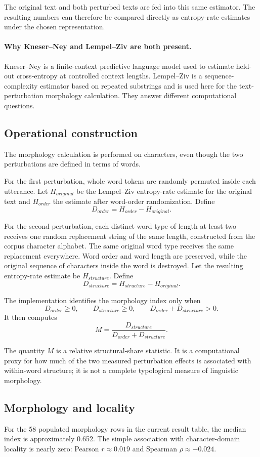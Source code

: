 \documentclass[11pt]{article}
\begin{document}
The original text and both perturbed texts are fed into this same estimator. The resulting numbers can therefore be compared directly as entropy-rate estimates under the chosen representation.

\paragraph{Why Kneser--Ney and Lempel--Ziv are both present.}
Kneser--Ney is a finite-context predictive language model used to estimate held-out cross-entropy at controlled context lengths. Lempel--Ziv is a sequence-complexity estimator based on repeated substrings and is used here for the text-perturbation morphology calculation. They answer different computational questions.

\subsection{Operational construction}
The morphology calculation is performed on characters, even though the two perturbations are defined in terms of words.

For the first perturbation, whole word tokens are randomly permuted inside each utterance. Let $H_{original}$ be the Lempel--Ziv entropy-rate estimate for the original text and $H_{order}$ the estimate after word-order randomization. Define
\[
D_{order}=H_{order}-H_{original}.
\]

For the second perturbation, each distinct word type of length at least two receives one random replacement string of the same length, constructed from the corpus character alphabet. The same original word type receives the same replacement everywhere. Word order and word length are preserved, while the original sequence of characters inside the word is destroyed. Let the resulting entropy-rate estimate be $H_{structure}$. Define
\[
D_{structure}=H_{structure}-H_{original}.
\]

The implementation identifies the morphology index only when
\[
D_{order}\ge0,\qquad D_{structure}\ge0,
\qquad D_{order}+D_{structure}>0.
\]
It then computes
\[
M=\frac{D_{structure}}{D_{order}+D_{structure}}.
\]

The quantity $M$ is a relative structural-share statistic. It is a computational proxy for how much of the two measured perturbation effects is associated with within-word structure; it is not a complete typological measure of linguistic morphology.

\subsection{Morphology and locality}
For the 58 populated morphology rows in the current result table, the median index is approximately 0.652. The simple association with character-domain locality is nearly zero: Pearson $r\approx 0.019$ and Spearman $\rho\approx -0.024$.
\end{document}
